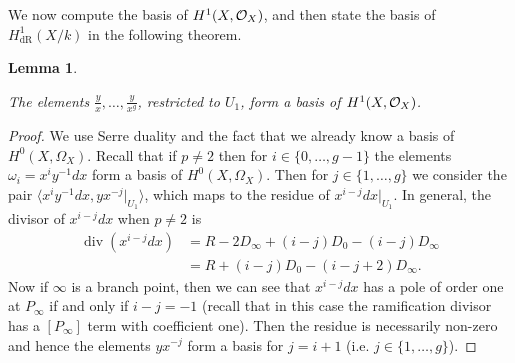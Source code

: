 \documentclass[draft, 11pt]{article} %
\theoremstyle{plain}
\newtheorem{lem}[defn]{Lemma}
\theoremstyle{remark}
\newcommand{\cO}{{\cal O}}
\newcommand{\hzero}{{H^0(X,\Omega_X)}}
\newcommand{\derhamhone}{H_{\text {dR}}^1(X/k)}
\DeclareMathOperator{\di}{div}
\begin{document}
We now compute the basis of $H^1(X,\cO_X)$, and then state the basis of $\derhamhone$ in the following theorem.
\begin{lem}\label{basish1}
 
 The elements $\frac{y}{x}, \ldots , \frac{y}{x^g}$, restricted to $U_1$, form a basis of $H^1(X,\cO_X)$.
 
\end{lem}
\begin{proof}
We use Serre duality and the fact that we already know a basis of $\hzero$.
Recall that if $p\neq 2$ then for $i \in \{0,\ldots, g-1\}$ the elements $\omega_i = x^iy^{-1}dx$ form a basis of $\hzero$.
Then for $j\in \{1, \ldots, g\}$  we consider the pair $\langle x^iy^{-1}dx, yx^{-j}|_{U_1}\rangle$, which maps to the residue of $x^{i-j}dx|_{U_1}$.
In general, the divisor of $x^{i-j}dx$ when $p\neq 2$ is
\begin{equation}\label{residuedivisor}
\begin{split}
\di(x^{i-j}dx) & = R - 2D_\infty +(i-j)D_0 - (i-j)D_\infty \\
& = R + (i-j)D_0 - (i-j+2)D_\infty.
\end{split}
\end{equation}
Now if $\infty$ is a branch point, then we can see that $x^{i-j}dx$ has a pole of order one at $P_\infty$ if and only if $i-j = -1$ (recall that in this case the ramification divisor has a $[P_\infty]$ term with coefficient one).
Then the residue is necessarily non-zero and hence the elements $yx^{-j}$ form a basis for $j= i+1$ (i.e. $j \in \{1, \ldots, g\}$).


\end{proof}
\end{document}
